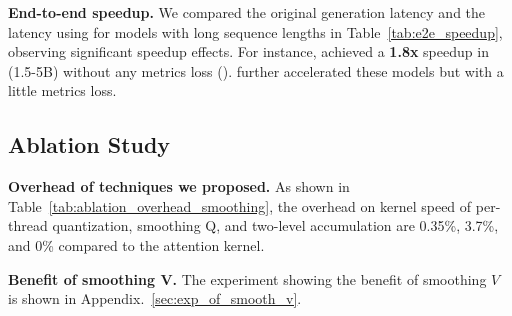 \noindent\textbf{End-to-end speedup.} We compared the original generation latency and the latency using \our for models with long sequence lengths in Table~\ref{tab:e2e_speedup}, observing significant speedup effects. For instance, \our achieved a \textbf{1.8x} speedup in \cogvideo(1.5-5B) without any metrics loss (\oure). \ourf further accelerated these models but with a little metrics loss.




\subsection{Ablation Study} \vspace{-.25em}
\noindent\textbf{Overhead of techniques we proposed.} As shown in Table~\ref{tab:ablation_overhead_smoothing}, the overhead on kernel speed of per-thread quantization, smoothing Q, and two-level accumulation are 0.35\%, 3.7\%, and 0\% compared to the attention kernel. 

\noindent\textbf{Benefit of smoothing V.} The experiment showing the benefit of smoothing $V$ is shown in Appendix.~\ref{sec:exp_of_smooth_v}. \vspace{-.25em} 
